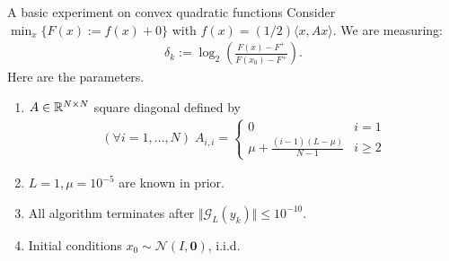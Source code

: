 \documentclass[11pt]{beamer}
\theoremstyle{definition}
\begin{document}
    \begin{frame}{A basic experiment on convex quadratic functions}
        Consider $\min_{x}\{F(x) := f(x) + 0\}$ with $f(x) = (1/2)\langle x, Ax\rangle$. 
        We are measuring: 
        \begin{align*}
            \delta_k := \log_2\left(
                \frac{F(x) - F^+}{F(x_0) - F^+}\right).  
        \end{align*}
        Here are the parameters. 
        \begin{enumerate}
            \item $A \in \mathbb R^{N \times N}$ square diagonal defined by 
            \begin{align*}
                (\forall i = 1, \ldots, N)\; A_{i, i} = \begin{cases}
                    0 & i = 1
                    \\
                    \mu + \frac{(i - 1)(L - \mu)}{N - 1} & i \ge 2
                \end{cases}
            \end{align*}
            \item $L = 1, \mu = 10^{-5}$ are known in prior. 
            \item All algorithm terminates after $\Vert \mathcal G_L(y_k) \Vert \le 10^{-10}$. 
            \item Initial conditions $x_0 \sim \mathcal N(I, \mathbf 0)$, i.i.d. 
        \end{enumerate}
    \end{frame}
\end{document}
